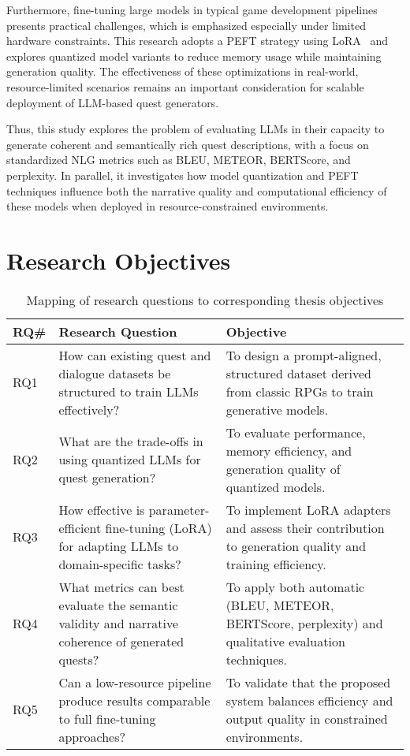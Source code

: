 Furthermore, fine-tuning large models in typical game development pipelines presents
practical challenges, which is emphasized especially under limited hardware constraints.
This research adopts a PEFT strategy using LoRA~\cite{hu2022lora,peft} and explores quantized model
variants to reduce memory usage while maintaining generation quality. The effectiveness
of these optimizations in real-world, resource-limited scenarios remains an important
consideration for scalable deployment of LLM-based quest generators.

Thus, this study explores the problem of evaluating LLMs in their capacity to generate
coherent and semantically rich quest descriptions, with a focus on standardized NLG
metrics such as BLEU, METEOR, BERTScore, and perplexity. In parallel, it investigates
how model quantization and PEFT techniques influence both the narrative quality and
computational efficiency of these models when deployed in resource-constrained environments.

\section{Research Objectives}

\begin{table}[t]
  \centering
  \scriptsize
  \renewcommand{\arraystretch}{1.3}
  \begin{tabularx}{0.95\textwidth}{
    >{\centering\arraybackslash}p{1cm}
    >{\raggedright\arraybackslash}X
    >{\raggedright\arraybackslash}X
  }
  \toprule
  \textbf{RQ\#} & \textbf{Research Question} & \textbf{Objective} \\
  \midrule
  RQ1
    & How can existing quest and dialogue datasets be structured to train LLMs effectively?
    & To design a prompt-aligned, structured dataset derived from classic RPGs to train generative models. \\
  RQ2
    & What are the trade-offs in using quantized LLMs for quest generation?
    & To evaluate performance, memory efficiency, and generation quality of quantized models. \\
  RQ3
    & How effective is parameter-efficient fine-tuning (LoRA) for adapting LLMs to domain-specific tasks?
    & To implement LoRA adapters and assess their contribution to generation quality and training efficiency. \\
  RQ4
    & What metrics can best evaluate the semantic validity and narrative coherence of generated quests?
    & To apply both automatic (BLEU, METEOR, BERTScore, perplexity) and qualitative evaluation techniques. \\
  RQ5
    & Can a low-resource pipeline produce results comparable to full fine-tuning approaches?
    & To validate that the proposed system balances efficiency and output quality in constrained environments. \\
  \bottomrule
  \end{tabularx}
  \caption{Mapping of research questions to corresponding thesis objectives}
  \label{table:research_questions}
\end{table}

